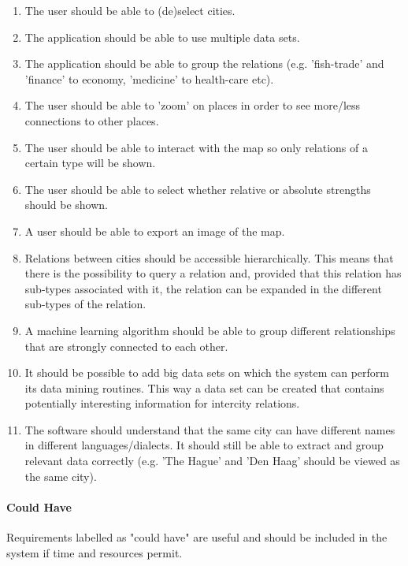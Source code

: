 \begin{enumerate}
    \item The user should be able to (de)select cities.
    \item The application should be able to use multiple data sets.
    \item The application should be able to group the relations (e.g. 'fish-trade' and 'finance' to economy, 'medicine' to health-care etc).
    \item The user should be able to 'zoom' on places in order to see more/less connections to other places.
    \item The user should be able to interact with the map so only relations of a certain type will be shown.
    \item The user should be able to select whether relative or absolute strengths should be shown.
    \item A user should be able to export an image of the map.
    \item Relations between cities should be accessible hierarchically. This means that there is the possibility to query a relation and, provided that this relation has sub-types associated with it, the relation can be expanded in the different sub-types of the relation.
    \item A machine learning algorithm should be able to group different relationships that are strongly connected to each other.
    \item It should be possible to add big data sets on which the system can perform its data mining routines. This way a data set can be created that contains potentially interesting information for intercity relations.
    \item The software should understand that the same city can have different names in different languages/dialects. It should still be able to extract and group relevant data correctly (e.g. 'The Hague' and 'Den Haag' should be viewed as the same city).
\end{enumerate}
\fi
\paragraph {Could Have}
Requirements labelled as "could have" are useful and should be included in the system if time and resources permit.

